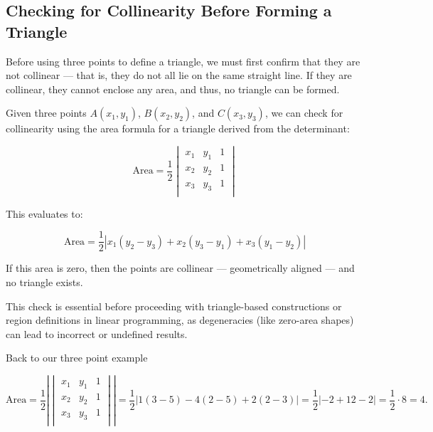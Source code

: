 \documentclass[10pt,twocolumn]{article}
\begin{document}
\subsection{Checking for Collinearity Before Forming a Triangle}

Before using three points to define a triangle, we must first confirm that they are not collinear — that is, they do not all lie on the same straight line. If they are collinear, they cannot enclose any area, and thus, no triangle can be formed.

Given three points \( A(x_1, y_1) \), \( B(x_2, y_2) \), and \( C(x_3, y_3) \), we can check for collinearity using the area formula for a triangle derived from the determinant:

\begin{equation}
\text{Area} = \frac{1}{2}
\begin{vmatrix}
x_1 & y_1 & 1 \\
x_2 & y_2 & 1 \\
x_3 & y_3 & 1 \\
\end{vmatrix}
\end{equation}


This evaluates to:

\begin{equation}
\text{Area} = \frac{1}{2} \left| x_1(y_2 - y_3) + x_2(y_3 - y_1) + x_3(y_1 - y_2) \right|
\end{equation}

If this area is zero, then the points are collinear — geometrically aligned — and no triangle exists.

This check is essential before proceeding with triangle-based constructions or region definitions in linear programming, as degeneracies (like zero-area shapes) can lead to incorrect or undefined results.

Back to our three point example

{\tiny
\begin{equation}
\text{Area} = \frac{1}{2} \left| 
\begin{vmatrix}
x_1 & y_1 & 1 \\
x_2 & y_2 & 1 \\
x_3 & y_3 & 1 \\
\end{vmatrix}
\right| = \frac{1}{2} \left| 1(3 - 5) - 4(2 - 5) + 2(2 - 3) \right| = \frac{1}{2} | -2 + 12 - 2 | = \frac{1}{2} \cdot 8 = 4.
\end{equation}
}
\end{document}
